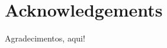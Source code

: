 \thispagestyle{empty}
\chapter*{Acknowledgements}\label{chap:acknowledgements}

Agradecimentos, aqui!